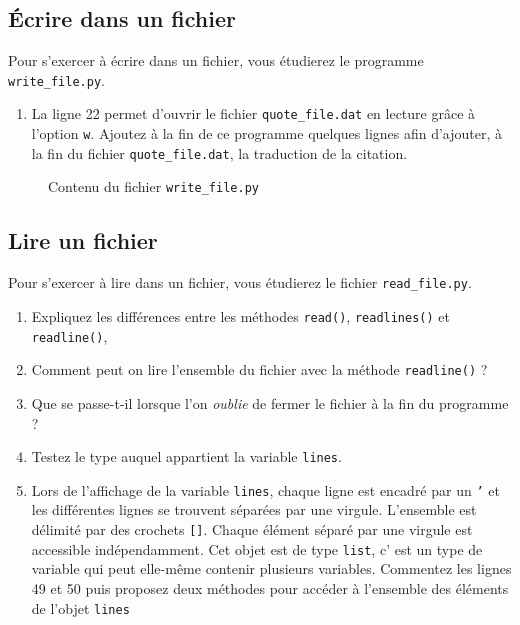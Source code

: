 
\subsection{Écrire dans un fichier}

Pour s'exercer à écrire dans un fichier, vous étudierez le programme \texttt{write\_file.py}.

\begin{enumerate}

\item La ligne 22 permet d'ouvrir le fichier \texttt{quote\_file.dat} en lecture grâce
  à l'option \texttt{w}.
  Ajoutez à la fin de ce programme quelques lignes afin d'ajouter, à la fin du
  fichier \texttt{quote\_file.dat}, la traduction de la citation.

\end{enumerate}

\begin{figure}  
  
  \caption{Contenu du fichier \texttt{write\_file.py}}
  \label{stat_write_file}
\end{figure}

\subsection{Lire un fichier}

Pour s'exercer à lire dans un fichier, vous étudierez le fichier \texttt{read\_file.py}.

\begin{enumerate}

\item Expliquez les différences entre les méthodes \texttt{read()},
  \texttt{readlines()} et \texttt{readline()},

\item Comment peut on lire l'ensemble du fichier avec la méthode \texttt{readline()} ?

\item Que se passe-t-il lorsque l'on \textit{oublie} de fermer le fichier à la fin du programme ?

\item Testez le type auquel appartient la variable \texttt{lines}.

\item Lors de l'affichage de la variable \texttt{lines}, chaque ligne est encadré par un \texttt{'} et
  les différentes lignes se trouvent séparées par une virgule. L'ensemble est délimité par des crochets \texttt{[]}.
  Chaque élément séparé par une virgule est accessible indépendamment.
  Cet objet est de type \texttt{list}, c' est un type de variable qui peut elle-même contenir plusieurs variables.
  Commentez les lignes 49 et 50 puis proposez deux méthodes pour accéder à l'ensemble des éléments de l'objet \texttt{lines}

\end{enumerate}


